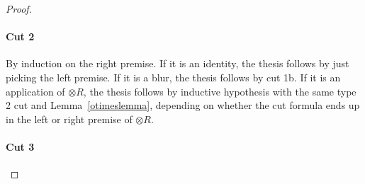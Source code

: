 \begin{proof}



  \paragraph{Cut 2}

  By induction on the right premise. If it is an identity, the thesis follows by
  just picking the left premise. If it is a blur, the thesis follows by cut
  1b. If it is an application of $\otimes R$, the thesis follows by inductive
  hypothesis with the same type 2 cut and Lemma~\ref{otimeslemma}, depending on
  whether the cut formula ends up in the left or right premise of $\otimes R$.

  \paragraph{Cut 3}


\end{proof}
